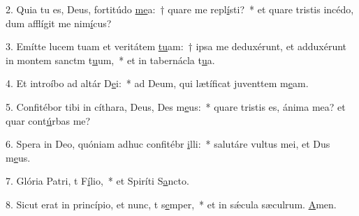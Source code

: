2. Quia tu es, Deus, fortitúdo \uline{me}a:~† quare me repl\uline{í}sti?~* et quare tristis incédo, dum afflígit me nim\uline{í}cus?\par 
3. Emítte lucem tuam et veritátem \uline{tu}am:~† ipsa me deduxérunt, et adduxérunt in montem sanctm t\uline{u}um,~* et in tabernácla t\uline{u}a.\par 
4. Et introíbo ad altár D\uline{e}i:~* ad Deum, qui lætíficat juventtem m\uline{e}am.\par 
5. Confitébor tibi in cíthara, Deus, Des m\uline{e}us:~* quare tristis es, ánima mea? et quar cont\uline{ú}rbas me?\par 
6. Spera in Deo, quóniam adhuc confitébr \uline{i}lli:~* salutáre vultus mei, et Dus m\uline{e}us.\par 
7. Glória Patri, t F\uline{í}lio,~* et Spiríti S\uline{a}ncto.\par 
8. Sicut erat in princípio, et nunc, t s\uline{e}mper,~* et in sǽcula sæculrum. \uline{A}men.\par 
